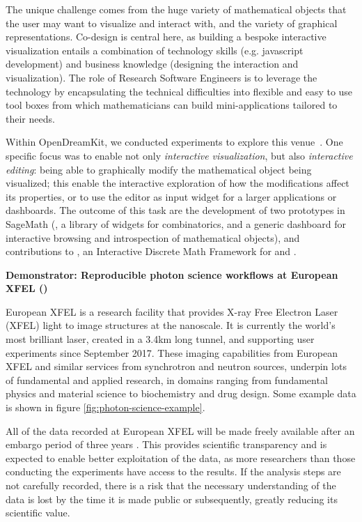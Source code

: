   The unique challenge comes from the huge variety of mathematical
  objects that the user may want to visualize and interact with, and
  the variety of graphical representations. Co-design is central here,
  as building a bespoke interactive visualization entails a
  combination of technology skills (e.g. javascript development) and
  business knowledge (designing the interaction and visualization).
  The role of Research Software Engineers is to leverage the
  technology by encapsulating the technical difficulties into flexible
  and easy to use tool boxes from which mathematicians can build
  mini-applications tailored to their needs.

  Within OpenDreamKit, we conducted experiments to explore this
  venue~\cite{ODK_D4.16}. One specific focus was to enable not only
  \emph{interactive visualization}, but also \emph{interactive
    editing}: being able to graphically modify the mathematical object
  being visualized; this enable the interactive exploration of how the
  modifications affect its properties, or to use the editor as input
  widget for a larger applications or dashboards. The outcome of this
  task are the development of two prototypes in SageMath
  (, a library of widgets for
  combinatorics, and  a generic dashboard for
  interactive browsing and introspection of mathematical objects), and
  contributions to , an Interactive Discrete Math
  Framework for  and .

\medskip
\textbf{Demonstrator: Reproducible photon science workflows at
  European XFEL ()}\label{sec:concept-demonstrator-photonscience}


  European XFEL is a research facility that provides X-ray Free
  Electron Laser (XFEL) light to image structures at the nanoscale. It
  is currently the world's most brilliant laser, created in a 3.4km
  long tunnel, and supporting user experiments since September
  2017. These imaging capabilities from European XFEL and similar
  services from synchrotron and neutron sources, underpin lots of
  fundamental and applied research, in domains ranging from fundamental
  physics and material science to biochemistry and drug design. Some
  example data is shown in figure \ref{fig:photon-science-example}.

  All of the data recorded at European XFEL will be made freely
  available after an embargo period of three years
  \cite{EuXFEL-datapolicy-2017}. This provides scientific transparency
  and is expected to enable better exploitation of the data, as more
  researchers than those conducting the experiments have access to the
  results. If the analysis steps are not carefully recorded, there is a risk
  that the necessary understanding of the data is lost by the time it
  is made public or subsequently, greatly reducing its scientific
  value.

